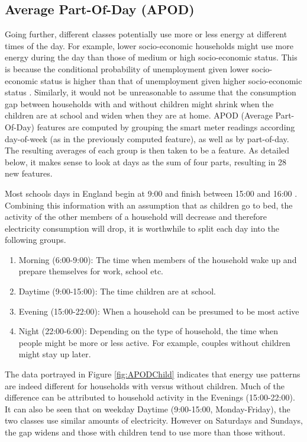 \subsection*{Average Part-Of-Day (APOD)}
Going further, different classes potentially use more or less energy at different times of the day. For example, lower socio-economic households might use more energy during the day than those of medium or high socio-economic status. This is because the conditional probability of unemployment given lower socio-economic status is higher than that of unemployment given higher socio-economic status \cite{Bartley}. Similarly, it would not be unreasonable to assume that the consumption gap between households with and without children might shrink when the children are at school and widen when they are at home. APOD (Average Part-Of-Day) features are computed by grouping the smart meter readings according day-of-week (as in the previously computed feature), as well as by part-of-day. The resulting averages of each group is then taken to be a feature. As detailed below, it makes sense to look at days as the sum of four parts, resulting in 28 new features.

Most schools days in England begin at 9:00 and finish between 15:00 and 16:00 \cite{school_times}. Combining this information with  an assumption that as children go to bed, the activity of the other members of a household will decrease and therefore electricity consumption will drop, it is worthwhile to split each day into the following groups.
\begin{enumerate}
\item Morning (6:00-9:00): The time when members of the household wake up and prepare themselves for work, school etc.
\item Daytime (9:00-15:00): The time children are at school.
\item Evening (15:00-22:00):  When a household can be presumed to be most active
\item Night (22:00-6:00): Depending on the type of household, the time when people might be more or less active. For example, couples without children might stay up later.
\end{enumerate}
\APODChild %


The data portrayed in Figure \ref{fig:APODChild} indicates that energy use patterns are indeed different for households with versus without children. Much of the difference can be attributed to household activity in the Evenings (15:00-22:00). It can also be seen that on weekday Daytime (9:00-15:00, Monday-Friday), the two classes use similar amounts of electricity. However on Saturdays and Sundays, the gap widens and those with children tend to use more than those without. 

